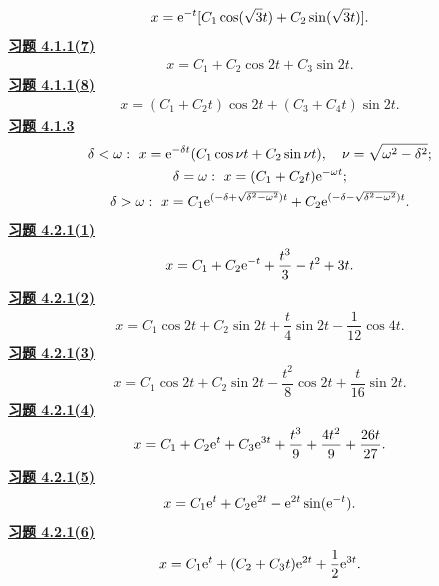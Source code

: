 \[\begin{gathered}x=\mathrm e^{-t}[C_1\cos(\sqrt3t)+C_2\sin(\sqrt3t)].\end{gathered}\]
\noindent\textbf{\hyperref[q:4.1.1(7)]{习题 4.1.1(7)}}
\[\begin{gathered}x=C_1+C_2\cos2t+C_3\sin2t.\end{gathered}\]
\noindent\textbf{\hyperref[q:4.1.1(8)]{习题 4.1.1(8)}}
\[\begin{gathered}x=(C_1+C_2t)\cos2t+(C_3+C_4t)\sin2t.\end{gathered}\]
\noindent\textbf{\hyperref[q:4.1.3]{习题 4.1.3}}
\[\begin{gathered}\delta<\omega:\ x=\mathrm e^{-\delta t}(C_1\cos\nu t+C_2\sin\nu t),\quad\nu=\sqrt{\omega^2-\delta^2};\\
\delta=\omega:\ x=(C_1+C_2t)\mathrm e^{-\omega t};\\
\delta>\omega:\ x=C_1\mathrm e^{(-\delta+\sqrt{\delta^2-\omega^2})t}
+C_2\mathrm e^{(-\delta-\sqrt{\delta^2-\omega^2})t}.\end{gathered}\]
\noindent\textbf{\hyperref[q:4.2.1(1)]{习题 4.2.1(1)}}
\[\begin{gathered}x=C_1+C_2\mathrm e^{-t}+\dfrac{t^3}{3}-t^2+3t.\end{gathered}\]
\noindent\textbf{\hyperref[q:4.2.1(2)]{习题 4.2.1(2)}}
\[\begin{gathered}x=C_1\cos2t+C_2\sin2t+\dfrac t4\sin2t-\dfrac1{12}\cos4t.\end{gathered}\]
\noindent\textbf{\hyperref[q:4.2.1(3)]{习题 4.2.1(3)}}
\[\begin{gathered}x=C_1\cos2t+C_2\sin2t-\dfrac{t^2}{8}\cos2t+\dfrac t{16}\sin2t.\end{gathered}\]
\noindent\textbf{\hyperref[q:4.2.1(4)]{习题 4.2.1(4)}}
\[\begin{gathered}x=C_1+C_2\mathrm e^t+C_3\mathrm e^{3t}+\dfrac{t^3}{9}+\dfrac{4t^2}{9}+\dfrac{26t}{27}.\end{gathered}\]
\noindent\textbf{\hyperref[q:4.2.1(5)]{习题 4.2.1(5)}}
\[\begin{gathered}x=C_1\mathrm e^t+C_2\mathrm e^{2t}-\mathrm e^{2t}\sin(\mathrm e^{-t}).\end{gathered}\]
\noindent\textbf{\hyperref[q:4.2.1(6)]{习题 4.2.1(6)}}
\[\begin{gathered}x=C_1\mathrm e^t+(C_2+C_3t)\mathrm e^{2t}+\dfrac12\mathrm e^{3t}.\end{gathered}\]
